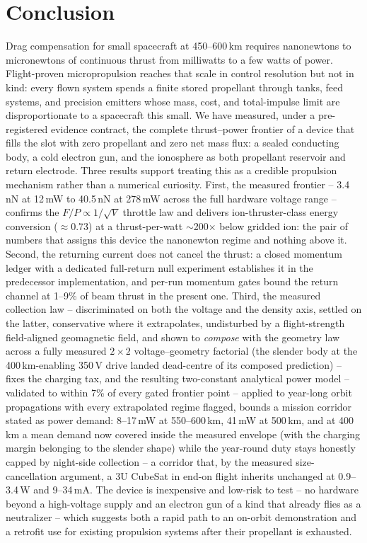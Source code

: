 \documentclass[11pt]{article}
\begin{document}
\section{Conclusion}
\label{sec:conclusion}
Drag compensation for small spacecraft at 450--600\,km requires
nanonewtons to micronewtons of continuous thrust from milliwatts to a few
watts of power. Flight-proven micropropulsion reaches that scale in control
resolution but not in kind: every flown system spends a finite stored
propellant through tanks, feed systems, and precision emitters whose mass,
cost, and total-impulse limit are disproportionate to a spacecraft this
small. We have measured, under a pre-registered evidence
contract, the complete thrust--power frontier of a device that fills the
slot with zero propellant and zero net mass flux: a sealed conducting body,
a cold electron gun, and the ionosphere as both propellant reservoir and
return electrode. Three results support treating this as a credible
propulsion mechanism rather than a numerical curiosity. First, the measured
frontier -- 3.4\,nN at 12\,mW to 40.5\,nN at 278\,mW across the full
hardware voltage range -- confirms the $F/P \propto 1/\sqrt{V}$ throttle
law and delivers ion-thruster-class energy conversion
($\approx$0.73) at a thrust-per-watt $\sim$200$\times$ below gridded ion:
the pair of numbers that assigns this device the nanonewton regime and
nothing above it. Second, the returning current does not cancel the
thrust: a closed momentum ledger with a dedicated full-return null
experiment establishes it in the predecessor implementation, and per-run
momentum gates bound the return channel at 1--9\% of beam thrust in the
present one. Third, the measured collection law -- discriminated on both
the voltage and the density axis, settled on the latter, conservative
where it extrapolates, undisturbed by a flight-strength field-aligned
geomagnetic field, and shown to \emph{compose} with the geometry law
across a fully measured $2{\times}2$ voltage--geometry factorial (the
slender body at the 400\,km-enabling 350\,V drive landed dead-centre of
its composed prediction) -- fixes the charging tax, and
the resulting two-constant analytical power model -- validated to within
7\% of every gated frontier point -- applied to year-long orbit
propagations with every extrapolated regime flagged, bounds a mission
corridor stated as power demand: 8--17\,mW at 550--600\,km, 41\,mW at
500\,km, and at 400\,km a mean demand now covered inside the measured
envelope (with the charging margin belonging to the slender shape) while
the year-round duty stays honestly capped by night-side collection -- a
corridor that, by the measured size-cancellation argument,
a 3U CubeSat in end-on flight inherits unchanged at 0.9--3.4\,W and
9--34\,mA. The device is inexpensive and low-risk to test -- no hardware
beyond a high-voltage supply and an electron gun of a kind that already
flies as a neutralizer -- which suggests both a rapid path to an on-orbit
demonstration and a retrofit use for existing propulsion systems after
their propellant is exhausted.
\end{document}
